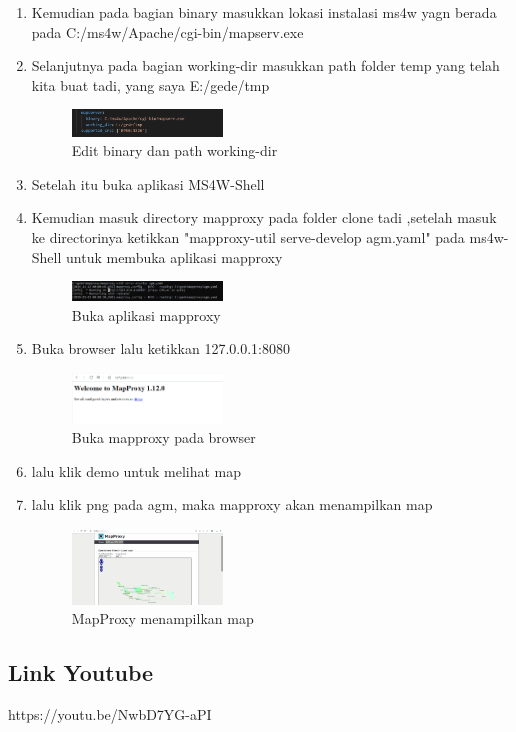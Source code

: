 \begin{enumerate}
  \item Kemudian pada bagian binary masukkan lokasi instalasi ms4w yagn berada pada C:/ms4w/Apache/cgi-bin/mapserv.exe
  \item Selanjutnya pada bagian working-dir masukkan path folder temp yang telah kita buat tadi, yang saya E:/gede/tmp
  \hfill\break
  \begin{figure}[H]
  \includegraphics[width=4cm]{figures/Tugas4/1174087/15.png}
  \centering
  \caption{Edit binary dan path working-dir}
  \end{figure}

  \item Setelah itu buka aplikasi MS4W-Shell
  \item Kemudian masuk directory mapproxy pada folder clone tadi ,setelah masuk ke directorinya ketikkan "mapproxy-util serve-develop agm.yaml" pada ms4w-Shell untuk membuka aplikasi mapproxy
  \hfill\break
  \begin{figure}[H]
  \includegraphics[width=4cm]{figures/Tugas4/1174087/16.png}
  \centering
  \caption{Buka aplikasi mapproxy}
  \end{figure}

  \item Buka browser lalu ketikkan 127.0.0.1:8080
  \hfill\break
  \begin{figure}[H]
  \includegraphics[width=4cm]{figures/Tugas4/1174087/17.png}
  \centering
  \caption{Buka mapproxy pada browser}
  \end{figure}

  \item lalu klik demo untuk melihat map
  \item lalu klik png pada agm, maka mapproxy akan menampilkan map
  \hfill\break
  \begin{figure}[H]
  \includegraphics[width=4cm]{figures/Tugas4/1174087/18.png}
  \centering
  \caption{MapProxy menampilkan map}
  \end{figure}

\end{enumerate}

\subsection{Link Youtube}
https://youtu.be/NwbD7YG-aPI